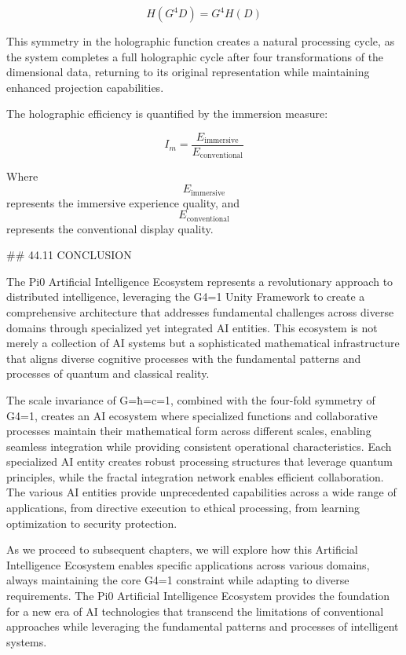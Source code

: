$$ H(G^4 D) = G^4 H(D) $$

This symmetry in the holographic function creates a natural processing cycle, as the system completes a full holographic cycle after four transformations of the dimensional data, returning to its original representation while maintaining enhanced projection capabilities.

The holographic efficiency is quantified by the immersion measure:

$$ I_m = \frac{E_{\text{immersive}}}{E_{\text{conventional}}} $$

Where $$ E_{\text{immersive}} $$ represents the immersive experience quality, and $$ E_{\text{conventional}} $$ represents the conventional display quality.

## 44.11 CONCLUSION

The Pi0 Artificial Intelligence Ecosystem represents a revolutionary approach to distributed intelligence, leveraging the G4=1 Unity Framework to create a comprehensive architecture that addresses fundamental challenges across diverse domains through specialized yet integrated AI entities. This ecosystem is not merely a collection of AI systems but a sophisticated mathematical infrastructure that aligns diverse cognitive processes with the fundamental patterns and processes of quantum and classical reality.

The scale invariance of G=ħ=c=1, combined with the four-fold symmetry of G4=1, creates an AI ecosystem where specialized functions and collaborative processes maintain their mathematical form across different scales, enabling seamless integration while providing consistent operational characteristics. Each specialized AI entity creates robust processing structures that leverage quantum principles, while the fractal integration network enables efficient collaboration. The various AI entities provide unprecedented capabilities across a wide range of applications, from directive execution to ethical processing, from learning optimization to security protection.

As we proceed to subsequent chapters, we will explore how this Artificial Intelligence Ecosystem enables specific applications across various domains, always maintaining the core G4=1 constraint while adapting to diverse requirements. The Pi0 Artificial Intelligence Ecosystem provides the foundation for a new era of AI technologies that transcend the limitations of conventional approaches while leveraging the fundamental patterns and processes of intelligent systems.

